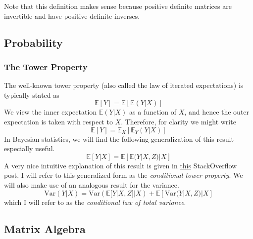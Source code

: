 \documentclass[12pt]{article}
\newcommand{\E}{\mathbb{E}}
\newcommand{\Var}{\mathrm{Var}}
\begin{document}
Note that this definition makes sense because positive definite matrices are invertible and have positive definite inverses. 



\subsection{Probability}
\subsubsection{The Tower Property}
The well-known tower property (also called the law of iterated expectations) is typically stated as 
\[\E[Y] = \E[\E(Y|X)]\]
We view the inner expectation $\E(Y|X)$ as a function of $X$, and hence the outer expectation is taken with respect to $X$. Therefore, for clarity we might write
\[\E[Y] = \E_X[\E_Y(Y|X)]\]
In Bayesian statistics, we will find the following generalization of this result especially useful. 
\[\E[Y|X] = \E[\E(Y|X, Z)|X]\] \label{tower_property}
A very nice intuitive explanation of this result is given in \href{https://stats.stackexchange.com/questions/95947/a-generalization-of-the-law-of-iterated-expectations}{this} StackOverflow post. 
I will refer to this generalized form as the \textit{conditional tower property}. We will also make use of an analogous result for the variance. 
\[\Var(Y|X) = \Var(\E[Y|X, Z]|X) + \E[\Var(Y|X, Z)|X]\] \label{variance_tower_property}
which I will refer to as the \textit{conditional law of total variance}. 

\subsection{Matrix Algebra}
\end{document}
